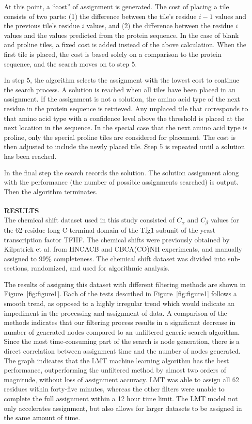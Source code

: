 \documentclass{article}
\begin{document}
\indent At this point, a “cost” of assignment is generated. The cost of placing a tile consists of two parts: (1) the difference between the tile's residue $i-1$ values and the previous tile's residue $i$ values, and (2) the difference between the residue $i$ values and the values predicted from the protein sequence. In the case of blank and proline tiles, a fixed cost is added instead of  the above calculation. When the first tile is placed, the cost is based solely on a comparison to the protein sequence, and the search moves on to step 5.

\indent In step 5, the algorithm selects the assignment with the lowest cost to continue the search process. A solution is reached when all tiles have been placed in an assignment. If the assignment is not a solution, the amino acid type of the next residue in the protein sequence is retrieved. Any unplaced tile that corresponds to that amino acid type with a confidence level above the threshold is placed at the next location in the sequence. In the special case that the next amino acid type is proline, only the special proline tiles are considered for placement. The cost is then adjusted to include the newly placed tile. Step 5 is repeated until a solution has been reached. 

\indent In the final step the search records the solution. The solution assignment along with the performance (the number of possible assignments searched) is output. Then the algorithm terminates. 
\\\\
\noindent\textbf{RESULTS}\\
\indent The chemical shift dataset used in this study consisted of $C_{\alpha}$ and $C_{\beta}$ values for the 62-residue long C-terminal domain of the Tfg1 subunit of the yeast transcription factor TFIIF. The chemical shifts were previously obtained by Kilpatrick et al. from HNCACB and CBCA(CO)NH experiments, and manually assigned to 99\% completeness\cite{kilpatrick}. The chemical shift dataset was divided into sub-sections, randomized, and used for algorithmic analysis. 

\indent The results of assigning this dataset with different filtering methods are shown in Figure~\ref{fig:figure1}. Each of the tests described in Figure~\ref{fig:figure1} follows a smooth trend, as opposed to a highly irregular trend which would indicate an impediment in the processing and assignment of data. A comparison of the methods indicates that our filtering process results in a significant decrease in number of generated nodes compared to an unfiltered generic search algorithm. Since the most time-consuming part of the search is node generation, there is a direct correlation between assignment time and the number of nodes generated. The graph indicates that the LMT machine learning algorithm has the best performance, outperforming the unfiltered method by almost two orders of magnitude, without loss of assignment accuracy. LMT was able to assign all 62 residues within forty-five minutes, whereas the other filters were unable to complete the full assignment within a 12 hour time limit. The LMT model not only accelerates assignment, but also allows for larger datasets to be assigned in the same amount of time. 
\end{document}
